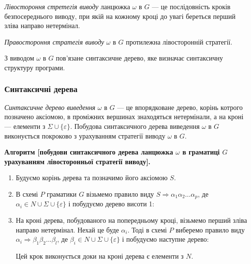 \textit{Лівостороння стретегія виводу} ланцюжка $\omega$ в $G$ --- це послідовність кроків безпосереднього виводу, при якій на кожному кроці до увагі береться перший зліва направо нетермінал. \medskip

\textit{Правостороння стратегія виводу} $\omega$ в $G$ протилежна лівосторонній стратегії. \medskip

З виводом $\omega$ в $G$ пов'язане синтаксичне дерево, яке визначає синтаксичну структуру програми.

\subsubsection{Синтаксичні дерева}

\textit{Синтаксичне дерево виведення} $\omega$ в $G$ --- це впорядковане дерево, корінь котрого позначено аксіомою, в проміжних вершинах знаходяться нетермінали, а на кроні --- елементи з $\Sigma \cup \{\varepsilon\}$. Побудова синтаксичного дерева виведення $\omega$ в $G$ виконується покроково з урахуванням стратегії виводу $\omega$ в $G$. \medskip


\textbf{Алгоритм [побудови синтаксичного дерева ланцюжка $\omega$ в \allowbreak граматиці $G$ урахуванням лівосторонньої стратегії виводу].}
\begin{enumerate}
	\item Будуємо корінь дерева та позначимо його аксіомою $S$.

	\item В схемі $P$ граматики $G$ візьмемо правило виду $S \Rightarrow \alpha_1 \alpha_2 \ldots \alpha_p$, де $\alpha_i \in N \cup \Sigma \cup \{\varepsilon\} $	і побудуємо дерево висоти 1: 
	\begin{figure}[H]
		\centering
		
	\end{figure}

	\item На кроні дерева, побудованого на попередньому кроці, візьмемо перший зліва направо нетермінал. Нехай це буде $\alpha_i$. Тоді в схемі $P$ виберемо правило виду $\alpha_i \Rightarrow \beta_1 \beta_2 \ldots \beta_l$, де $\beta_i \in N \cup \Sigma \cup \{\varepsilon\}$ і побудуємо наступне дерево: 
	\begin{figure}[H]
		\centering
		
	\end{figure}

	Цей крок виконується доки на кроні дерева є елементи з $N$.
\end{enumerate}

